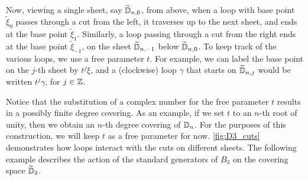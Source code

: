 Now, viewing a single sheet, say $\widetilde{\mathbb{D}}_{n,0}$, from above, when a loop with base point $\tilde{\xi}_0$ passes through a cut from the left, it traverses up to the next sheet, and ends at the base point $\tilde{\xi}_1$. Similarly, a loop passing through a cut from the right ends at the base point $\tilde{\xi}_{-1}$, on the sheet $\widetilde{\mathbb{D}}_{n,-1}$ below $\widetilde{\mathbb{D}}_{n,0}$. To keep track of the various loops, we use a free parameter $t$. For example, we can label the base point on the $j$-th sheet by $t^j\xi$, and a (clockwise) loop $\gamma$ that starts on $\widetilde{\mathbb{D}}_{n,j}$ would be written $t^j \gamma$, for $j\in\mathbb{Z}$.

Notice that the substitution of a complex number for the free parameter $t$ results in a possibly finite degree covering. As an example, if we set $t$ to an $n$-th root of unity, then we obtain an $n$-th degree covering of $\mathbb{D}_n$. For the purposes of this construction, we will keep $t$ as a free parameter for now.{ }\cref{fig:D3_cuts} demonstrates how loops interact with the cuts on different sheets. The following example describes the action of the standard generators of $B_3$ on the covering space $\widetilde{\mathbb{D}}_3$.

